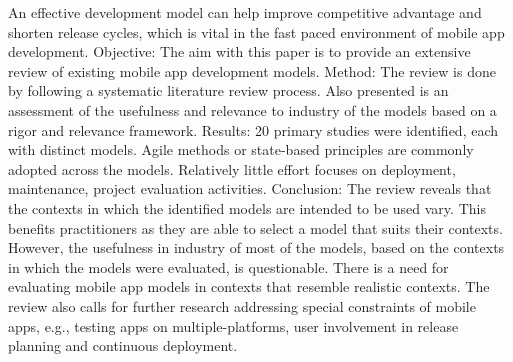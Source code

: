 \documentclass{article}
\begin{document}
An effective development model can help improve competitive advantage and shorten release cycles,
which is vital in the fast paced environment of mobile app development.
Objective: The aim with this paper is to provide an extensive review of existing mobile app development
models.
Method: The review is done by following a systematic literature review process. Also presented is an assessment of the usefulness and relevance to industry of the models based on a rigor and relevance framework.
Results: 20 primary studies were identified, each with distinct models. Agile methods or state-based principles
are commonly adopted across the models. Relatively little effort focuses on deployment, maintenance, project
evaluation activities.
Conclusion: The review reveals that the contexts in which the identified models are intended to be used vary.
This benefits practitioners as they are able to select a model that suits their contexts. However, the usefulness in
industry of most of the models, based on the contexts in which the models were evaluated, is questionable. There
is a need for evaluating mobile app models in contexts that resemble realistic contexts. The review also calls for
further research addressing special constraints of mobile apps, e.g., testing apps on multiple-platforms, user
involvement in release planning and continuous deployment.\cite{jabangwe2018software}

\printbibliography
\end{document}
